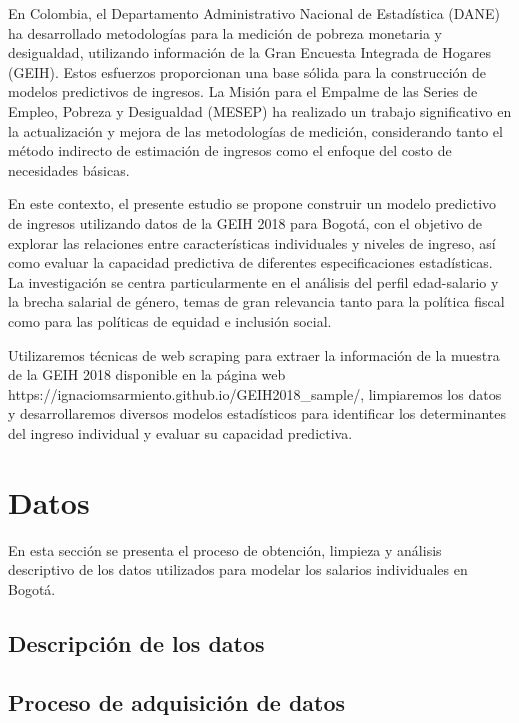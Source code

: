 \documentclass[12pt,a4paper,onecolumn]{article}
\begin{document}
En Colombia, el Departamento Administrativo Nacional de Estadística (DANE) ha desarrollado metodologías para la medición de pobreza monetaria y desigualdad, utilizando información de la Gran Encuesta Integrada de Hogares (GEIH). Estos esfuerzos proporcionan una base sólida para la construcción de modelos predictivos de ingresos. La Misión para el Empalme de las Series de Empleo, Pobreza y Desigualdad (MESEP) ha realizado un trabajo significativo en la actualización y mejora de las metodologías de medición, considerando tanto el método indirecto de estimación de ingresos como el enfoque del costo de necesidades básicas.

En este contexto, el presente estudio se propone construir un modelo predictivo de ingresos utilizando datos de la GEIH 2018 para Bogotá, con el objetivo de explorar las relaciones entre características individuales y niveles de ingreso, así como evaluar la capacidad predictiva de diferentes especificaciones estadísticas. La investigación se centra particularmente en el análisis del perfil edad-salario y la brecha salarial de género, temas de gran relevancia tanto para la política fiscal como para las políticas de equidad e inclusión social.

Utilizaremos técnicas de web scraping para extraer la información de la muestra de la GEIH 2018 disponible en la página web https://ignaciomsarmiento.github.io/GEIH2018\_sample/, limpiaremos los datos y desarrollaremos diversos modelos estadísticos para identificar los determinantes del ingreso individual y evaluar su capacidad predictiva.

\section{Datos}
En esta sección se presenta el proceso de obtención, limpieza y análisis descriptivo de los datos utilizados para modelar los salarios individuales en Bogotá.

\subsection{Descripción de los datos}

\subsection{Proceso de adquisición de datos}
\end{document}
